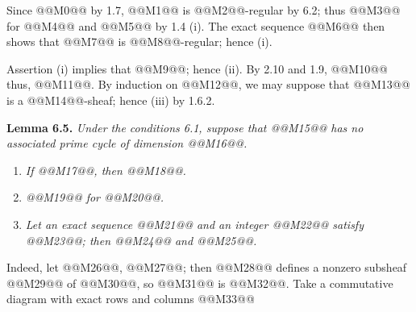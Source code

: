 Since @@M0@@ by 1.7, @@M1@@ is @@M2@@-regular by 6.2; thus @@M3@@ for @@M4@@ and @@M5@@ by 1.4 (i). The exact sequence @@M6@@ then shows that @@M7@@ is @@M8@@-regular; hence (i).

Assertion (i) implies that @@M9@@; hence (ii). By 2.10 and 1.9,
@@M10@@
thus, @@M11@@. By induction on @@M12@@, we may suppose that @@M13@@ is a @@M14@@-sheaf; hence (iii) by 1.6.2.

\textbf{Lemma 6.5.} \emph{Under the conditions 6.1, suppose that @@M15@@ has no associated prime cycle of dimension @@M16@@.}
\begin{enumerate}[label=(\roman*)]
\item \emph{If @@M17@@, then @@M18@@.}
\item \emph{@@M19@@ for @@M20@@.}
\item \emph{Let an exact sequence @@M21@@ and an integer @@M22@@ satisfy @@M23@@; then @@M24@@ and @@M25@@.}
\end{enumerate}
Indeed, let @@M26@@, @@M27@@; then @@M28@@ defines a nonzero subsheaf @@M29@@ of @@M30@@, so @@M31@@ is @@M32@@. Take a commutative diagram with exact rows and columns
@@M33@@
